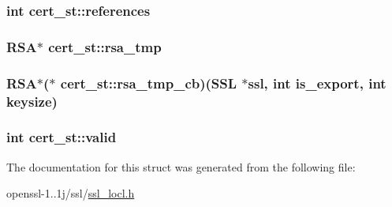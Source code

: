 \hypertarget{structcert__st_a35da30deb4ca647a4b9e010be514621f}{
\subsubsection[{references}]{\setlength{\rightskip}{0pt plus 5cm}int cert\-\_\-st\-::references}}\label{structcert__st_a35da30deb4ca647a4b9e010be514621f}
\hypertarget{structcert__st_a066253814d4b5677d244f93a83af231e}{
\subsubsection[{rsa\-\_\-tmp}]{\setlength{\rightskip}{0pt plus 5cm}R\-S\-A$\ast$ cert\-\_\-st\-::rsa\-\_\-tmp}}\label{structcert__st_a066253814d4b5677d244f93a83af231e}
\hypertarget{structcert__st_af734d256dd42b25ca0cd753b66d6688a}{
\subsubsection[{rsa\-\_\-tmp\-\_\-cb}]{\setlength{\rightskip}{0pt plus 5cm}R\-S\-A$\ast$($\ast$ cert\-\_\-st\-::rsa\-\_\-tmp\-\_\-cb)(S\-S\-L $\ast$ssl, int is\-\_\-export, int keysize)}}\label{structcert__st_af734d256dd42b25ca0cd753b66d6688a}
\hypertarget{structcert__st_a838ae8304f54182a7fd514e982d22db7}{
\subsubsection[{valid}]{\setlength{\rightskip}{0pt plus 5cm}int cert\-\_\-st\-::valid}}\label{structcert__st_a838ae8304f54182a7fd514e982d22db7}


The documentation for this struct was generated from the following file\-:\begin{DoxyCompactItemize}
\item 
openssl-\/1..\-1j/ssl/\hyperlink{ssl__locl_8h}{ssl\-\_\-locl.\-h}\end{DoxyCompactItemize}
